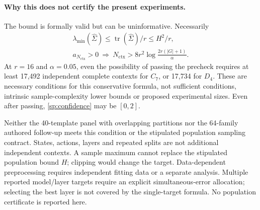 \paragraph{Why this does not certify the present experiments.}
The bound is formally valid but can be uninformative. Necessarily
\[
\begin{gathered}
 \lambda_{\min}(\widehat\Sigma)\le\operatorname{tr}(\widehat\Sigma)/r\le H^2/r,\\
 a_{N_{\mathrm{ctx}}}>0\ \Longrightarrow\
 N_{\mathrm{ctx}}>8r^2\log\frac{2r(|G|+1)}\alpha.
\end{gathered}
\]
At $r=16$ and $\alpha=0.05$, even the possibility of passing the precheck requires at least 17,492 independent complete contexts for $C_7$, or 17,734 for $D_4$. These are necessary conditions for this conservative formula, not sufficient conditions, intrinsic sample-complexity lower bounds or proposed experimental sizes. Even after passing, \cref{sp:confidence} may be $[0,2]$.

Neither the 40-template panel with overlapping partitions nor the 64-family authored follow-up meets this condition or the stipulated population sampling contract. States, actions, layers and repeated splits are not additional independent contexts. A sample maximum cannot replace the stipulated population bound $H$; clipping would change the target. Data-dependent preprocessing requires independent fitting data or a separate analysis. Multiple reported model/layer targets require an explicit simultaneous-error allocation; selecting the best layer is not covered by the single-target formula. No population certificate is reported here.

